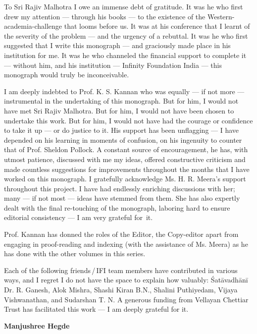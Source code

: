 To Sri Rajiv Malhotra I owe an immense debt of gratitude. It was he who first drew my attention --- through his books --- to the existence of the Western-academia-challenge that looms before us. It was at his conference that I learnt of the severity of the problem --- and the urgency of a rebuttal. It was he who first suggested that I write this monograph --- and graciously made place in his institution for me. It was he who channeled the financial support to complete it --- without him, and his institution --- Infinity Foundation India --- this monograph would truly be inconceivable.   

I am deeply indebted to Prof. K. S. Kannan who was equally --- if not more --- instrumental in the undertaking of this monograph. But for him, I would not have met Sri Rajiv Malhotra. But for him, I would not have been chosen to undertake this work. But for him, I would not have had the courage or confidence to take it up --- or do justice to it. His support has been unflagging --- I have depended on his learning in moments of confusion, on his ingenuity to counter that of Prof. Sheldon Pollock. A constant source of encouragement, he has, with utmost patience, discussed with me my ideas, offered constructive criticism and made countless suggestions for improvements throughout the months that I have worked on this monograph.  I gratefully acknowledge Ms. H. R. Meera’s support throughout this project. I have had endlessly enriching discussions with her; many --- if not most --- ideas have stemmed from them.  She has also expertly dealt with the final re-touching of the monograph, laboring hard to ensure editorial consistency --- I am very grateful for~it.

Prof. Kannan has donned the roles of the Editor, the Copy-editor apart from engaging in proof-reading and indexing (with the assistance of Ms. Meera) as he has done with the other volumes in this series. 

Each of the following friends\,/\,IFI team members have contributed in various ways, and I regret I do not have the space to explain how valuably: Śatāvadhānī Dr. R. Ganesh, Alok Mishra, Shashi Kiran B.N., Shalini Puthiyedam, Vijaya Vishwanathan, and Sudarshan T. N. A generous funding from Vellayan Chettiar Trust has facilitated this work --- I am deeply grateful for it. 


\bigskip
\hfill {\bf Manjushree Hegde}

\newpage

~\phantom{a}

\vskip 57pt

